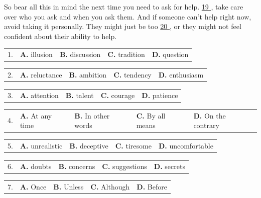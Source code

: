 \documentclass[UTF8,11pt]{ctexart}
\begin{document}
So bear all this in mind the next time you need to ask for help. \uline{19 }, take care over who you ask and when you ask them. And if someone can’t help right now, avoid taking it personally. They might just be too \uline{20 }, or they might not feel confident about their ability to help.


\noindent\begin{tabularx}{\linewidth}{@{}lXXXX@{}}1. & \textbf{A.} illusion & \textbf{B.} discussion & \textbf{C.} tradition & \textbf{D.} question\\\end{tabularx}\par

\noindent\begin{tabularx}{\linewidth}{@{}lXXXX@{}}2. & \textbf{A.} reluctance & \textbf{B.} ambition & \textbf{C.} tendency & \textbf{D.} enthusiasm\\\end{tabularx}\par

\noindent\begin{tabularx}{\linewidth}{@{}lXXXX@{}}3. & \textbf{A.} attention & \textbf{B.} talent & \textbf{C.} courage & \textbf{D.} patience\\\end{tabularx}\par

\noindent\begin{tabularx}{\linewidth}{@{}lXXXX@{}}4. & \textbf{A.} At any time & \textbf{B.} In other words & \textbf{C.} By all means & \textbf{D.} On the contrary\\\end{tabularx}\par

\noindent\begin{tabularx}{\linewidth}{@{}lXXXX@{}}5. & \textbf{A.} unrealistic & \textbf{B.} deceptive & \textbf{C.} tiresome & \textbf{D.} uncomfortable\\\end{tabularx}\par

\noindent\begin{tabularx}{\linewidth}{@{}lXXXX@{}}6. & \textbf{A.} doubts & \textbf{B.} concerns & \textbf{C.} suggestions & \textbf{D.} secrets\\\end{tabularx}\par

\noindent\begin{tabularx}{\linewidth}{@{}lXXXX@{}}7. & \textbf{A.} Once & \textbf{B.} Unless & \textbf{C.} Although & \textbf{D.} Before\\\end{tabularx}\par
\end{document}

